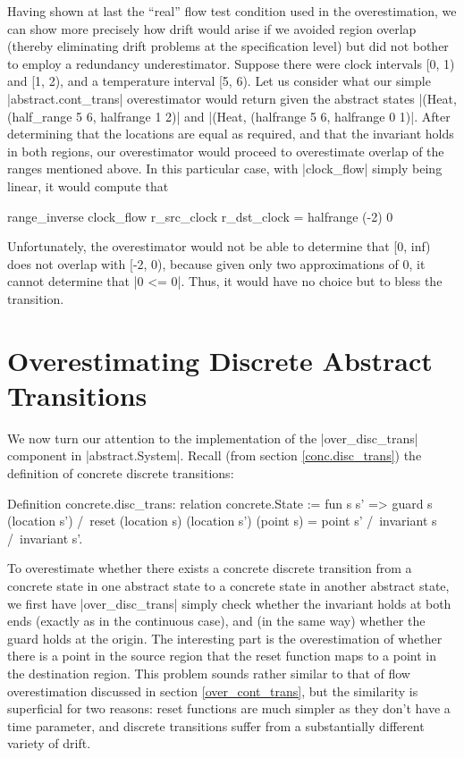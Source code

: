 \documentclass[runningheads]{llncs}
\begin{document}

Having shown at last the ``real'' flow test condition used in the overestimation, we can show more precisely how drift would arise if we avoided region overlap (thereby eliminating drift problems at the specification level) but did not bother to employ a redundancy underestimator. Suppose there were clock intervals [0, 1) and [1, 2), and a temperature interval [5, 6). Let us consider what our simple |abstract.cont_trans| overestimator would return given the abstract states |(Heat, (half_range 5 6, halfrange 1 2)| and |(Heat, (halfrange 5 6, halfrange 0 1)|. After determining that the locations are equal as required, and that the invariant holds in both regions, our overestimator would proceed to overestimate overlap of the ranges mentioned above. In this particular case, with |clock_flow| simply being linear, it would compute that
\begin{code}range_inverse clock_flow r_src_clock r_dst_clock = halfrange (-2) 0\end{code} Unfortunately, the overestimator would not be able to determine that [0, inf) does not overlap with [-2, 0), because given only two approximations of 0, it cannot determine that |0 <= 0|. Thus, it would have no choice but to bless the transition.


\section{Overestimating Discrete Abstract Transitions}
\label{over_disc_trans}

We now turn our attention to the implementation of the |over_disc_trans| component in |abstract.System|. Recall (from section \ref{conc.disc_trans}) the definition of concrete discrete transitions:
\begin{code}
  Definition concrete.disc_trans: relation concrete.State := fun s s' =>
    guard s (location s') /\
     reset (location s) (location s') (point s) = point s' /\
      invariant s /\ invariant s'.
\end{code}

To overestimate whether there exists a concrete discrete transition from a concrete state in one abstract state to a concrete state in another abstract state, we first have |over_disc_trans| simply check whether the invariant holds at both ends (exactly as in the continuous case), and (in the same way) whether the guard holds at the origin. The interesting part is the overestimation of whether there is a point in the source region that the reset function maps to a point in the destination region. This problem sounds rather similar to that of flow overestimation discussed in section \ref{over_cont_trans}, but the similarity is superficial for two reasons: reset functions are much simpler as they don't have a time parameter, and discrete transitions suffer from a substantially different variety of drift.
\end{document}
